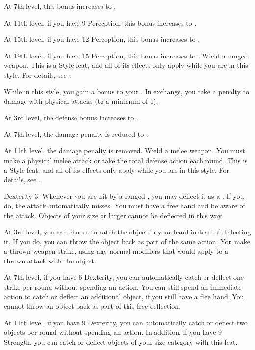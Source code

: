     At 7th level, this bonus increases to .

    At 11th level, if you have 9 Perception, this bonus increases to .

    At 15th level, if you have 12 Perception, this bonus increases to .

    At 19th level, if you have 15 Perception, this bonus increases to .
    \stylereq Wield a ranged weapon.
     This is a Style feat, and all of its effects only apply while you are in this style.
    For details, see .

    \featben While in this style, you gain a  bonus to your .
    In exchange, you take a  penalty to damage with physical attacks (to a minimum of 1).

    At 3rd level, the defense bonus increases to .

    At 7th level, the damage penalty is reduced to .

    At 11th level, the damage penalty is removed.
    \stylereq Wield a melee weapon. You must make a physical melee attack or take the total defense action each round.
     This is a Style feat, and all of its effects only apply while you are in this style.
    For details, see .

    \featpres Dexterity 3.
    \featben Whenever you are hit by a ranged , you may deflect it as a .
    If you do, the attack automatically misses.
    You must have a free hand and be aware of the attack.
    Objects of your size or larger cannot be deflected in this way.

    At 3rd level, you can choose to catch the object in your hand instead of deflecting it.
    If you do, you can throw the object back as part of the same action.
    You make a thrown weapon strike, using any normal modifiers that would apply to a thrown attack with the object.

    At 7th level, if you have 6 Dexterity, you can automatically catch or deflect one strike per round without spending an action.
    You can still spend an immediate action to catch or deflect an additional object, if you still have a free hand.
    You cannot throw an object back as part of this free deflection.

    At 11th level, if you have 9 Dexterity, you can automatically catch or deflect two objects per round without spending an action.
    In addition, if you have 9 Strength, you can catch or deflect objects of your size category with this feat.

